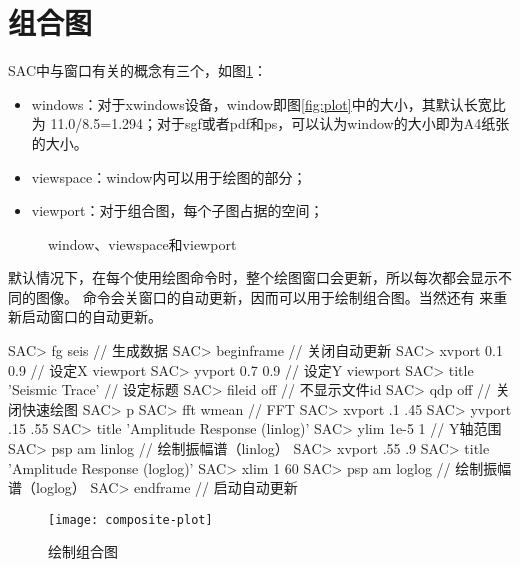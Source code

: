 \section{组合图}
\label{sec:composite-plots}

SAC中与窗口有关的概念有三个，如图\ref{fig:window-viewspace-viewport}：
\begin{itemize}
\item windows：对于xwindows设备，window即图\ref{fig:plot}中的大小，其默认长宽比为
    11.0/8.5=1.294；对于sgf或者pdf和ps，可以认为window的大小即为A4纸张的大小。
\item viewspace：window内可以用于绘图的部分；
\item viewport：对于组合图，每个子图占据的空间；
\end{itemize}

\begin{figure}[H]
\centering
{}
\caption{window、viewspace和viewport}
\label{fig:window-viewspace-viewport}
\end{figure}

默认情况下，在每个使用绘图命令时，整个绘图窗口会更新，所以每次都会显示不同的图像。
命令会关窗口的自动更新，因而可以用于绘制组合图。当然还有
来重新启动窗口的自动更新。

\begin{SACCode}
SAC> fg seis                        // 生成数据
SAC> beginframe                     // 关闭自动更新
SAC> xvport 0.1 0.9                 // 设定X viewport
SAC> yvport 0.7 0.9                 // 设定Y viewport
SAC> title 'Seismic Trace'          // 设定标题
SAC> fileid off                     // 不显示文件id
SAC> qdp off                        // 关闭快速绘图
SAC> p                              
SAC> fft wmean                      // FFT
SAC> xvport .1 .45                  
SAC> yvport .15 .55
SAC> title 'Amplitude Response (linlog)'
SAC> ylim 1e-5 1                    // Y轴范围
SAC> psp am linlog                  // 绘制振幅谱（linlog）
SAC> xvport .55 .9                  
SAC> title 'Amplitude Response (loglog)'
SAC> xlim 1 60
SAC> psp am loglog                  // 绘制振幅谱（loglog）
SAC> endframe                       // 启动自动更新
\end{SACCode}

\begin{figure}[H]
\centering
\texttt{[image: composite-plot]}
\caption{绘制组合图}
\label{fig:composite-plot}
\end{figure}
